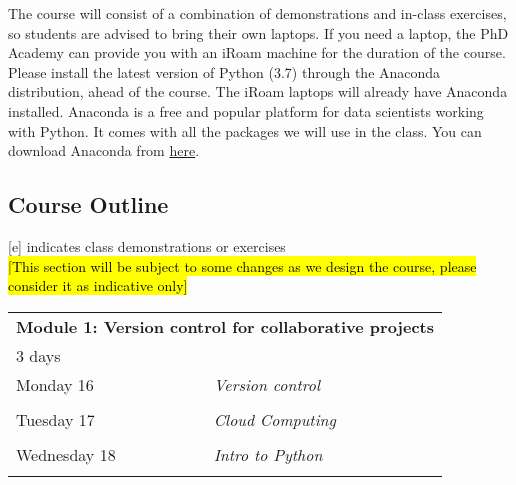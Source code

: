 \documentclass{article}
\numberwithin{equation}{section}
\begin{document}
\vspace{0.5cm}

The course will consist of a combination of demonstrations and in-class exercises, so students are advised to bring their own laptops. If you need a laptop, the PhD Academy can provide you with an iRoam machine for the duration of the course.\\

Please install the latest version of Python (3.7) through the Anaconda distribution, ahead of the course. The iRoam laptops will already have Anaconda installed. Anaconda is a free and popular platform for data scientists working with Python. It comes with all the packages we will use in the class. You can download Anaconda from \href{https://www.anaconda.com/distribution/}{here}.

\vspace{0.5cm}

\subsection*{Course Outline}

\vspace{0.5cm}

[e] indicates class demonstrations or exercises\\

\hl{[This section will be subject to some changes as we design the course, please consider it as indicative only]} \\

\begin{center}
    \begin{tabular}{| p{2.5cm} | p{12.5cm} |}
    \hline
    \multicolumn{2}{|l|}{\textbf{Module 1: Version control for collaborative projects}} \\
    \multicolumn{2}{|l|}{3 days} \\
    \hline
       Monday 16  & \textit{Version control} \\
      
            & \\
       Tuesday 17  & \textit{Cloud Computing} \\
            & \\
       Wednesday 18 & \textit{Intro to Python} \\
            & \\
    \hline
    \end{tabular}
\end{center}
\end{document}
